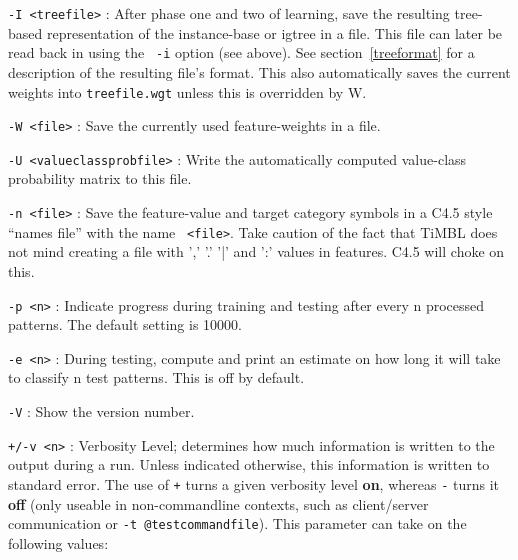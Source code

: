 \documentclass{report}
\begin{document}
\begin{description}

\item {\tt -I <treefile>} : After phase one and two of learning, save
the resulting tree-based representation of the instance-base or {\sc
igtree} in a file. This file can later be read back in using the {\tt
-i} option (see above). See section~\ref{treeformat} for a description
of the resulting file's format. This also automatically saves the
current weights into {\tt treefile.wgt} unless this is overridden by
{\-W}.

\item {\tt -W <file>} : Save the currently used feature-weights in a
file.

\item {\tt -U <valueclassprobfile>} : Write the automatically computed
value-class probability matrix to this file.

\item {\tt -n <file>} : Save the feature-value and target category
symbols in a C4.5 style ``names file'' with the name {\tt
<file>}. Take caution of the fact that TiMBL does not mind creating a
file with ',' '.' '|' and ':' values in features. C4.5 will choke on this.

\item {\tt -p <n>} : Indicate progress during training and testing
after every n processed patterns. The default setting is 10000.

\item {\tt -e <n>} : During testing, compute and print an estimate on
how long it will take to classify n test patterns. This is off by
default.

\item {\tt -V} : Show the version number.

\item {\tt +/-v <n>} : Verbosity Level; determines how much
information is written to the output during a run. Unless indicated
otherwise, this information is written to standard error. The use of
{\tt +} turns a given verbosity level {\bf on}, whereas {\tt -} turns
it {\bf off} (only useable in non-commandline contexts, such as
client/server communication or {\tt -t @testcommandfile}). This
parameter can take on the following values:


\end{description}
\end{document}
